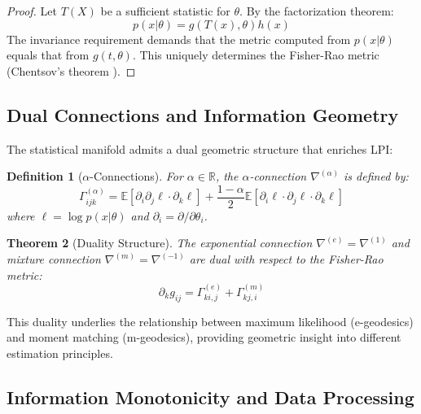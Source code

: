 \documentclass[11pt]{article}
\newtheorem{theorem}{Theorem}
\newtheorem{definition}[theorem]{Definition}
\begin{document}
\begin{proof}
Let $T(X)$ be a sufficient statistic for $\theta$. By the factorization theorem:
\begin{equation}
p(x|\theta) = g(T(x), \theta)h(x)
\end{equation}
The invariance requirement demands that the metric computed from $p(x|\theta)$ equals that from $g(t, \theta)$. This uniquely determines the Fisher-Rao metric (Chentsov's theorem \cite{chentsov1982statistical}).
\end{proof}

\subsection{Dual Connections and Information Geometry}

The statistical manifold admits a dual geometric structure that enriches LPI:

\begin{definition}[$\alpha$-Connections]
For $\alpha \in \mathbb{R}$, the $\alpha$-connection $\nabla^{(\alpha)}$ is defined by:
\begin{equation}
\Gamma_{ijk}^{(\alpha)} = \mathbb{E}\left[\partial_i \partial_j \ell \cdot \partial_k \ell\right] + \frac{1-\alpha}{2}\mathbb{E}\left[\partial_i \ell \cdot \partial_j \ell \cdot \partial_k \ell\right]
\end{equation}
where $\ell = \log p(x|\theta)$ and $\partial_i = \partial/\partial\theta_i$.
\end{definition}

\begin{theorem}[Duality Structure]
The exponential connection $\nabla^{(e)} = \nabla^{(1)}$ and mixture connection $\nabla^{(m)} = \nabla^{(-1)}$ are dual with respect to the Fisher-Rao metric:
\begin{equation}
\partial_k g_{ij} = \Gamma_{ki,j}^{(e)} + \Gamma_{kj,i}^{(m)}
\end{equation}
\end{theorem}

This duality underlies the relationship between maximum likelihood (e-geodesics) and moment matching (m-geodesics), providing geometric insight into different estimation principles.

\subsection{Information Monotonicity and Data Processing}
\end{document}
